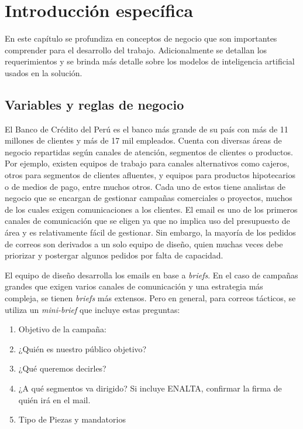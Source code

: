 \chapter{Introducción específica} %

\label{Chapter2}

En este capítulo se profundiza en conceptos de negocio que son importantes comprender para el desarrollo del trabajo. Adicionalmente se detallan los requerimientos y se brinda más detalle sobre los modelos de inteligencia artificial usados en la solución.

\section{Variables y reglas de negocio}
\label{sec:Negocio}

El Banco de Crédito del Perú es el banco más grande de su país con más de 11 millones de clientes y más de 17 mil empleados. Cuenta con diversas áreas de negocio repartidas según canales de atención, segmentos de clientes o productos. Por ejemplo, existen equipos de trabajo para canales alternativos como cajeros, otros para segmentos de clientes afluentes, y equipos para productos hipotecarios o de medios de pago, entre muchos otros. Cada uno de estos tiene analistas de negocio que se encargan de gestionar campañas comerciales o proyectos, muchos de los cuales exigen comunicaciones a los clientes. El email es uno de los primeros canales de comunicación que se eligen ya que no implica uso del presupuesto de área y es relativamente fácil de gestionar. Sin embargo, la mayoría de los pedidos de correos son derivados a un solo equipo de diseño, quien muchas veces debe priorizar y postergar algunos pedidos por falta de capacidad.

El equipo de diseño desarrolla los emails en base a \textit{briefs}. En el caso de campañas grandes que exigen varios canales de comunicación y una estrategia más compleja, se tienen \textit{briefs} más extensos. Pero en general, para correos tácticos, se utiliza un \textit{mini-brief} que incluye estas preguntas:

\begin{enumerate}
    \item Objetivo de la campaña:
    \item ¿Quién es nuestro público objetivo?
    \item ¿Qué queremos decirles?
    \item ¿A qué segmentos va dirigido? Si incluye ENALTA, confirmar la firma de quién irá en el mail.
    \item Tipo de Piezas y mandatorios
\end{enumerate}

